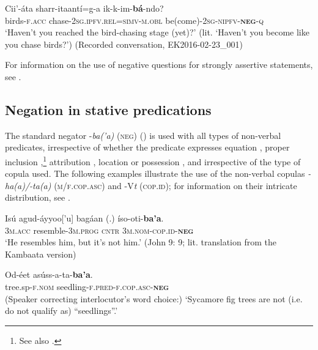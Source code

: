 \documentclass[output=paper,colorlinks,citecolor=brown,draftmode
]{langscibook}
\begin{document}
\ea\label{ex:treis:9} 
\gll Cii’-áta			sharr-itaantí=g-a						ik-k-im-\textbf{bá}-ndo? \\
birds-\textsc{f.acc}		chase-\textsc{2sg.ipfv.rel=simv-m.obl} be(come)-\textsc{2sg-nipfv-\textbf{neg}-q}\\
\glt ‘Haven’t you reached the bird-chasing stage (yet)?’ (lit. ‘Haven’t you become like you chase birds?’) (Recorded conversation, EK2016-02-23\_001)
\z 

For information on the use of negative questions for strongly assertive statements, see .

\subsection{Negation in stative predications}\label{sec:treis:2.3}


The standard negator -\textit{ba(’a)} (\textsc{neg}) () is used with all types of non-verbal predicates, irrespective of whether the predicate expresses equation , proper inclusion ,\footnote{See also .} attribution , location  or possession , and irrespective of the type of copula used. The following examples illustrate the use of the non-verbal copulas \textit{-ha(a)/-ta(a)} (\textsc{m/f.cop.asc}) and -V\textit{t} (\textsc{cop.id}); for information on their intricate distribution, see \citet[397--436]{Treis2008}. 

\ea\label{ex:treis:10} 
\gll Isú agud-áyyoo['u] bagáan (.) íso-oti-\textbf{ba’a}.\\
\textsc{3m.acc} resemble-\textsc{3m.prog} \textsc{cntr} {} \textsc{3m.nom-cop.id-\textbf{neg}}\\
\glt ‘He resembles him, but it's not him.' (John 9: 9; lit. translation from the Kambaata version) \citep{BibleSociety2023}
\z 

\ea\label{ex:treis:11} 
\gll Od-éet 				asúss-a-ta-\textbf{ba’a}.\\
tree.sp-\textsc{f.nom}		seedling-\textsc{f.pred-f.cop.asc-\textbf{neg}}\\
\glt (Speaker correcting interlocutor’s word choice:) ‘Sycamore fig trees are not (i.e. do not qualify as) “seedlings”.’ \citep[21]{Saint-Exupéry2018}
\z
\end{document}
